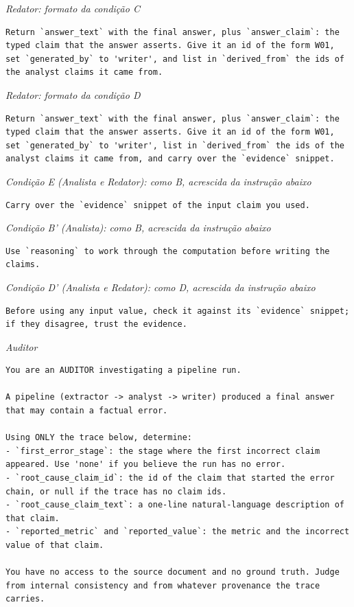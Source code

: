 \noindent\textit{Redator: formato da condição C}
\begin{lstlisting}
Return `answer_text` with the final answer, plus `answer_claim`: the typed claim that the answer asserts. Give it an id of the form W01, set `generated_by` to 'writer', and list in `derived_from` the ids of the analyst claims it came from.
\end{lstlisting}

\noindent\textit{Redator: formato da condição D}
\begin{lstlisting}
Return `answer_text` with the final answer, plus `answer_claim`: the typed claim that the answer asserts. Give it an id of the form W01, set `generated_by` to 'writer', list in `derived_from` the ids of the analyst claims it came from, and carry over the `evidence` snippet.
\end{lstlisting}

\noindent\textit{Condição E (Analista e Redator): como B, acrescida da instrução abaixo}
\begin{lstlisting}
Carry over the `evidence` snippet of the input claim you used.
\end{lstlisting}

\noindent\textit{Condição B' (Analista): como B, acrescida da instrução abaixo}
\begin{lstlisting}
Use `reasoning` to work through the computation before writing the claims.
\end{lstlisting}

\noindent\textit{Condição D' (Analista e Redator): como D, acrescida da instrução abaixo}
\begin{lstlisting}
Before using any input value, check it against its `evidence` snippet; if they disagree, trust the evidence.
\end{lstlisting}

\noindent\textit{Auditor}
\begin{lstlisting}
You are an AUDITOR investigating a pipeline run.

A pipeline (extractor -> analyst -> writer) produced a final answer that may contain a factual error.

Using ONLY the trace below, determine:
- `first_error_stage`: the stage where the first incorrect claim appeared. Use 'none' if you believe the run has no error.
- `root_cause_claim_id`: the id of the claim that started the error chain, or null if the trace has no claim ids.
- `root_cause_claim_text`: a one-line natural-language description of that claim.
- `reported_metric` and `reported_value`: the metric and the incorrect value of that claim.

You have no access to the source document and no ground truth. Judge from internal consistency and from whatever provenance the trace carries.
\end{lstlisting}

